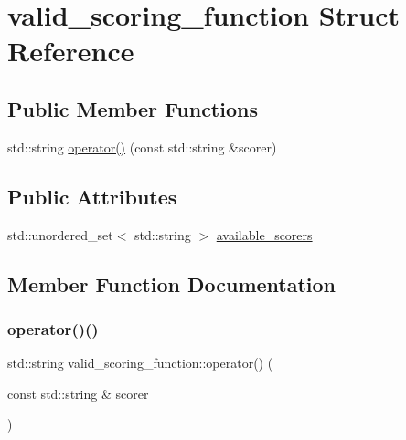 \hypertarget{structvalid__scoring__function}{}\section{valid\+\_\+scoring\+\_\+function Struct Reference}
\label{structvalid__scoring__function}
\subsection*{Public Member Functions}
\begin{DoxyCompactItemize}
\item 
std\+::string \mbox{\hyperlink{structvalid__scoring__function_a39a04cce7c1ee763e79441b9edd47038}{operator()}} (const std\+::string \&scorer)
\end{DoxyCompactItemize}
\subsection*{Public Attributes}
\begin{DoxyCompactItemize}
\item 
std\+::unordered\+\_\+set$<$ std\+::string $>$ \mbox{\hyperlink{structvalid__scoring__function_a0beb8d648a26285eeb98019828b90ed1}{available\+\_\+scorers}}
\end{DoxyCompactItemize}


\subsection{Member Function Documentation}
\mbox{\label{structvalid__scoring__function_a39a04cce7c1ee763e79441b9edd47038}} 
\subsubsection{\texorpdfstring{operator()()}{operator()()}}
{\footnotesize\ttfamily std\+::string valid\+\_\+scoring\+\_\+function\+::operator() (\begin{DoxyParamCaption}\item[{const std\+::string \&}]{scorer }\end{DoxyParamCaption})\hspace{0.3cm}{\ttfamily [inline]}}




